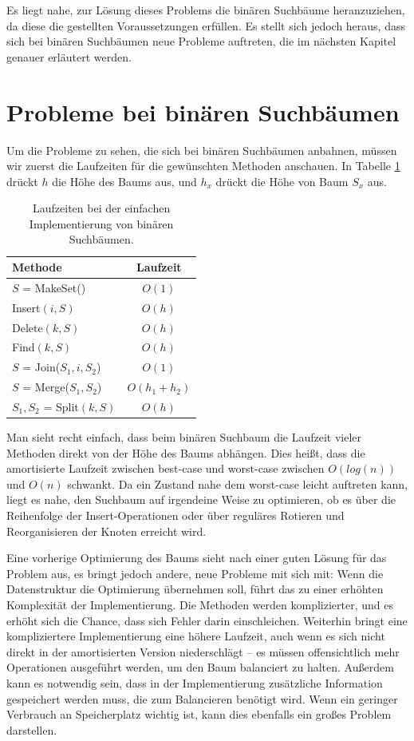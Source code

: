 \documentclass[a4paper]{scrreprt}
\theoremstyle{definition}
\begin{document}
Es liegt nahe, zur Lösung dieses Problems die binären Suchbäume heranzuziehen, da diese die gestellten Voraussetzungen erfüllen.
Es stellt sich jedoch heraus, dass sich bei binären Suchbäumen neue Probleme auftreten, die im nächsten Kapitel genauer erläutert werden.

\section{Probleme bei binären Suchbäumen}
\label{sec:binaryproblems}

Um die Probleme zu sehen, die sich bei binären Suchbäumen anbahnen, müssen wir zuerst die Laufzeiten für die gewünschten Methoden anschauen. In Tabelle \ref{tab:binarytree} drückt $h$ die Höhe des Baums aus, und $h_x$ drückt die Höhe von Baum $S_x$ aus.

\begin{table}
\centering
\label{tab:binarytree}
\begin{tabular}{l|c}
	Methode & Laufzeit\\
	\hline
	$S$ = MakeSet() & $O(1)$\\
	Insert$(i, S)$ & $O(h)$ \\
	Delete$(k, S)$ & $O(h)$ \\
	Find$(k, S)$ & $O(h)$ \\
	$S$ = Join($S_1, i, S_2$) & $O(1)$ \\
	$S$ = Merge($S_1, S_2$) & $O(h_1 + h_2)$ \\
	$S_1, S_2$ = Split$(k, S)$ & $O(h)$
\end{tabular}
\caption[Laufzeiten Binärbaum]{Laufzeiten bei der einfachen Implementierung von binären Suchbäumen.} %
\end{table}

Man sieht recht einfach, dass beim binären Suchbaum die Laufzeit vieler Methoden direkt von der Höhe des Baums abhängen. 
Dies heißt, dass die amortisierte Laufzeit zwischen best-case und worst-case zwischen $O(log(n))$ und $O(n)$ schwankt.
Da ein Zustand nahe dem worst-case leicht auftreten kann, liegt es nahe, den Suchbaum auf irgendeine Weise zu optimieren, ob es über die Reihenfolge der Insert-Operationen oder über reguläres Rotieren und Reorganisieren der Knoten erreicht wird.

Eine vorherige Optimierung des Baums sieht nach einer guten Lösung für das Problem aus, es bringt jedoch andere, neue Probleme mit sich mit:
Wenn die Datenstruktur die Optimierung übernehmen soll, führt das zu einer erhöhten Komplexität der Implementierung. 
Die Methoden werden komplizierter, und es erhöht sich die Chance, dass sich Fehler darin einschleichen. 
Weiterhin bringt eine kompliziertere Implementierung eine höhere Laufzeit, auch wenn es sich nicht direkt in der amortisierten Version niederschlägt -- es müssen offensichtlich mehr Operationen ausgeführt werden, um den Baum balanciert zu halten. 
Außerdem kann es notwendig sein, dass in der Implementierung zusätzliche Information gespeichert werden muss, die zum Balancieren benötigt wird. 
Wenn ein geringer Verbrauch an Speicherplatz wichtig ist, kann dies ebenfalls ein großes Problem darstellen.
\end{document}
